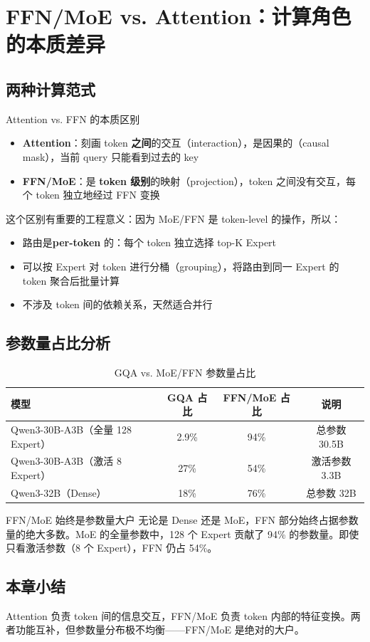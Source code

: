 \section{FFN/MoE vs. Attention：计算角色的本质差异}

\subsection{两种计算范式}

\begin{importantbox}{Attention vs. FFN 的本质区别}
\begin{itemize}
  \item \textbf{Attention}：刻画 token \textbf{之间}的交互（interaction），是因果的（causal mask），当前 query 只能看到过去的 key
  \item \textbf{FFN/MoE}：是 \textbf{token 级别}的映射（projection），token 之间没有交互，每个 token 独立地经过 FFN 变换
\end{itemize}
\end{importantbox}

这个区别有重要的工程意义：因为 MoE/FFN 是 token-level 的操作，所以：
\begin{itemize}
  \item 路由是\textbf{per-token} 的：每个 token 独立选择 top-K Expert
  \item 可以按 Expert 对 token 进行分桶（grouping），将路由到同一 Expert 的 token 聚合后批量计算
  \item 不涉及 token 间的依赖关系，天然适合并行
\end{itemize}

\subsection{参数量占比分析}

\begin{table}[H]
\centering
\caption{GQA vs. MoE/FFN 参数量占比}
\begin{tabular}{lccc}
\toprule
\textbf{模型} & \textbf{GQA 占比} & \textbf{FFN/MoE 占比} & \textbf{说明} \\
\midrule
Qwen3-30B-A3B（全量 128 Expert） & 2.9\% & 94\% & 总参数 30.5B \\
Qwen3-30B-A3B（激活 8 Expert） & 27\% & 54\% & 激活参数 3.3B \\
Qwen3-32B（Dense） & 18\% & 76\% & 总参数 32B \\
\bottomrule
\end{tabular}
\end{table}

\begin{knowledgebox}{FFN/MoE 始终是参数量大户}
无论是 Dense 还是 MoE，FFN 部分始终占据参数量的绝大多数。MoE 的全量参数中，128 个 Expert 贡献了 94\% 的参数量。即使只看激活参数（8 个 Expert），FFN 仍占 54\%。
\end{knowledgebox}

\subsection{本章小结}

Attention 负责 token 间的信息交互，FFN/MoE 负责 token 内部的特征变换。两者功能互补，但参数量分布极不均衡——FFN/MoE 是绝对的大户。

